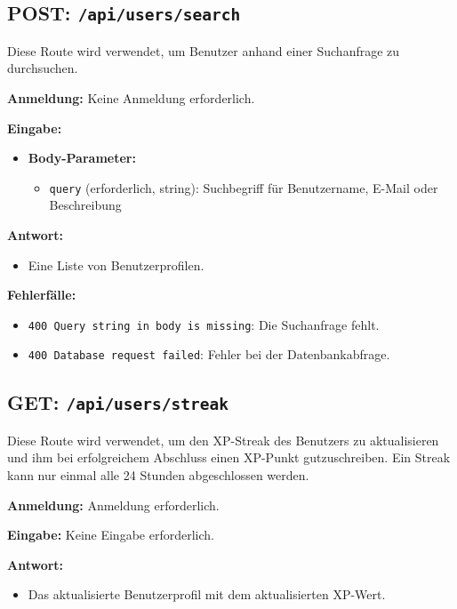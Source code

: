 \documentclass[a4paper,12pt]{article}
\begin{document}
\newpage
\subsection{POST: \texttt{/api/users/search}}

Diese Route wird verwendet, um Benutzer anhand einer Suchanfrage zu
durchsuchen.

\textbf{Anmeldung:} Keine Anmeldung erforderlich.

\textbf{Eingabe:}
\begin{itemize}
    \item \textbf{Body-Parameter:}
    \begin{itemize}
        \item \texttt{query} (erforderlich, string):
            Suchbegriff für Benutzername, E-Mail oder Beschreibung
    \end{itemize}
\end{itemize}

\textbf{Antwort:}
\begin{itemize}
    \item Eine Liste von Benutzerprofilen.
\end{itemize}

\textbf{Fehlerfälle:}
\begin{itemize}
    \item \texttt{400 Query string in body is missing}:
        Die Suchanfrage fehlt.
    \item \texttt{400 Database request failed}:
        Fehler bei der Datenbankabfrage.
\end{itemize}

\subsection{GET: \texttt{/api/users/streak}}

Diese Route wird verwendet, um den XP-Streak des Benutzers zu aktualisieren und
ihm bei erfolgreichem Abschluss einen XP-Punkt gutzuschreiben. Ein Streak kann
nur einmal alle 24 Stunden abgeschlossen werden.

\textbf{Anmeldung:} Anmeldung erforderlich.

\textbf{Eingabe:} Keine Eingabe erforderlich.

\textbf{Antwort:}
\begin{itemize}
    \item Das aktualisierte Benutzerprofil mit dem aktualisierten XP-Wert.
\end{itemize}
\end{document}
